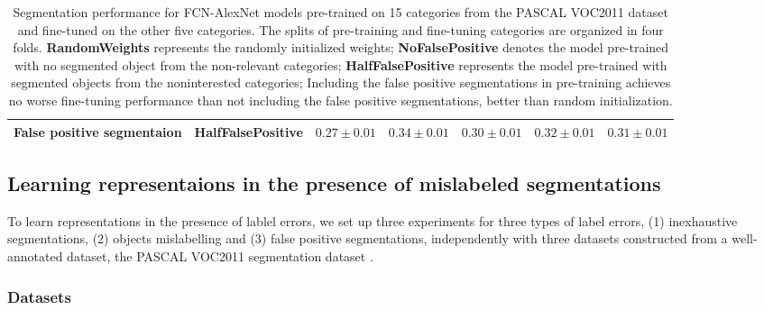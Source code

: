 \begin{table}[t]
{\begin{tabular}{l|c|cccc|c}
False positive segmentaion                                                      & HalfFalsePositive                                                  & \multicolumn{1}{l}{$0.27\pm0.01$}                                                                       & \multicolumn{1}{l}{$0.34\pm0.01$}                                                           & \multicolumn{1}{l}{$0.30\pm0.01$}                                                                              & \multicolumn{1}{l|}{$0.32\pm0.01$}                                                                      & $\mathbf{0.31\pm0.01}$                                                                                                 \\ \hline

\end{tabular}
}
\caption{
Segmentation performance for FCN-AlexNet models pre-trained on 15 categories from the PASCAL VOC2011 dataset and fine-tuned on the other five categories.
The splits of pre-training and fine-tuning categories are organized in four folds.
\textbf{RandomWeights} represents the randomly initialized weights;
\textbf{NoFalsePositive} denotes the model pre-trained with no segmented object from the non-relevant categories;
\textbf{HalfFalsePositive} represents the model pre-trained with segmented objects from the noninterested categories;
Including the false positive segmentations in pre-training achieves no worse fine-tuning performance than not including the false positive segmentations, better than random initialization.
}
\label{tab:falsepos}
\end{table}


\subsection{Learning representaions in the presence of mislabeled segmentations}
\label{subsec:robustness}


To learn representations in the presence of lablel errors, we set up three experiments for three types of label errors, (1) inexhaustive segmentations, (2) objects mislabelling and (3) false positive segmentations, independently with three datasets constructed from a well-annotated dataset, the PASCAL VOC2011 segmentation dataset \cite{everingham2015pascal}.


\subsubsection{Datasets}
\label{subsubsec:noises}

